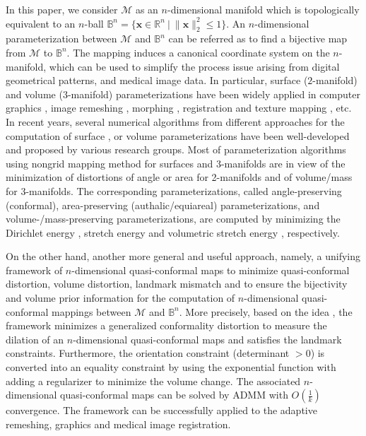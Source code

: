 \documentclass{article}
\begin{document}
In this paper, we consider $\mathcal{M}$ as an $n$-dimensional manifold which is topologically equivalent to an $n$-ball $\mathbb{B}^n = \{\mathbf{x}\in \mathbb{R}^n~|~\|\mathbf{x}\|_2^2 \leq 1\}$. An $n$-dimensional parameterization between $\mathcal{M}$ and $\mathbb{B}^n$ can be referred as to find a bijective map from $\mathcal{M}$ to $\mathbb{B}^n$. The mapping induces a canonical coordinate system on the $n$-manifold, which can be used to simplify the process issue arising from digital geometrical patterns, and medical image data. In particular, surface ($2$-manifold) and volume (3-manifold) parameterizations have been widely applied in computer graphics \cite{MGBS21}, image remeshing \cite{KSNL19,CPXG17}, morphing \cite{MHWW17}, registration \cite{KCLM14,RSWZ17,CPGP18} and texture mapping \cite{LBPS02,LMKC13}, etc. In recent years, several numerical algorithms from different approaches for the computation of surface \cite{AGGP21,PTLM15,SHSA00, RSKC17, MHWW19}, or volume \cite{KSWC17,MHTL19,XGFL16,MHTL20,JWTL23,YJGP15} parameterizations have been well-developed and proposed by various research groups. Most of parameterization algorithms using nongrid mapping method for surfaces and 3-manifolds are in view of the minimization of distortions of angle or area for 2-manifolds and of volume/mass for 3-manifolds. The corresponding parameterizations, called angle-preserving (conformal), area-preserving (authalic/equiareal) parameterizations, and volume-/mass-preserving parameterizations, are computed by minimizing the Dirichlet energy \cite{MHWW17,YCWW21}, stretch energy \cite{MHWW19} and volumetric stretch energy \cite{MHTL19,MHTL20,TMWH23}, respectively.

On the other hand, another more general and useful approach, namely, a unifying framework of $n$-dimensional quasi-conformal maps \cite{DPGP22} to minimize quasi-conformal distortion, volume distortion, landmark mismatch and to ensure the bijectivity and volume prior information for the computation of $n$-dimensional quasi-conformal mappings between $\mathcal{M}$ and $\mathbb{B}^n$. More precisely, based on the idea \cite{YTKC15}, the framework \cite{DPGP22} minimizes a generalized conformality distortion to measure the dilation of an $n$-dimensional quasi-conformal maps and satisfies the landmark constraints. Furthermore, the orientation constraint (determinant $>0$) is converted into an equality constraint by using the exponential function with adding a regularizer to minimize the volume change. The associated $n$-dimensional quasi-conformal maps can be solved by ADMM with $O(\frac{1}{k})$ convergence. The framework \cite{DPGP22} can be successfully applied to the adaptive remeshing, graphics and medical image registration.
\end{document}
